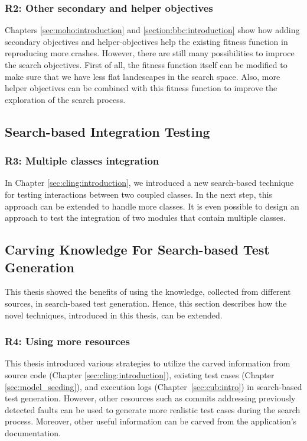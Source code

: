 \subsubsection{R2: Other secondary and helper objectives}
 Chapters \ref{sec:moho:introduction} and \ref{section:bbc:introduction} show how adding secondary objectives and helper-objectives help the existing \CrashFunction fitness function in reproducing more crashes. However, there are still many possibilities to improce the search objectives. First of all, the \CrashFunction fitness function itself can be modified to make sure that we have less flat landescapes in the search space. Also, more helper objectives can be combined with this fitness function to improve the exploration of the search process.



\subsection{Search-based Integration Testing}
\subsubsection{R3: Multiple classes integration}
In Chapter \ref{sec:cling:introduction}, we introduced a new search-based technique for testing interactions between two coupled classes. In the next step, this approach can be extended to handle more classes. It is even possible to design an approach to test the integration of two modules that contain multiple classes.

\subsection{Carving Knowledge For Search-based Test Generation}
This thesis showed the benefits of using the knowledge, collected from different sources, in search-based test generation. Hence, this section describes how the novel techniques, introduced in this thesis, can be extended.

\subsubsection{R4: Using more resources}
This thesis introduced various strategies to utilize the carved information from source code (\eg Chapter \ref{sec:cling:introduction}), existing test cases (\eg Chapter \ref{sec:model_seeding}), and execution logs (Chapter~\ref{sec:cub:intro}) in search-based test generation. However, other resources such as commits addressing previously detected faults can be used to generate more realistic test cases during the search process. Moreover, other useful information can be carved from the application's documentation.

